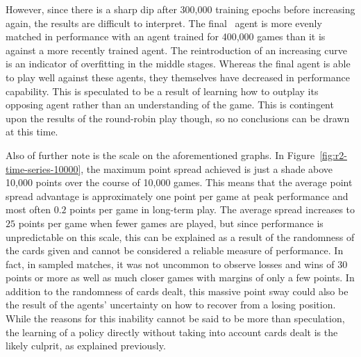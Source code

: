However,
since there is a sharp dip after 300,000 training epochs before increasing
again,
the results are difficult to interpret.
%
The final \learned\ agent is more evenly matched in performance with an agent
trained for 400,000 games
than it is against a more recently trained agent.
%
The reintroduction of an increasing curve
is an indicator of overfitting in the middle stages.
%
Whereas the final agent is able to play well against these agents,
they themselves have decreased in performance capability.
%
This is speculated to be a result of learning how to outplay its opposing agent
rather than an understanding of the game.
%
This is contingent upon the results of the round-robin play though,
so no conclusions can be drawn at this time.

Also of further note is the scale on the aforementioned graphs.
%
In Figure~\ref{fig:r2-time-series-10000},
the maximum point spread achieved is just a shade above 10,000 points
over the course of 10,000 games.
%
This means that the average point spread advantage is approximately 
one point per game at peak performance\textemdash
and most often $0.2$ points per game\textemdash
in long-term play.
%
The average spread increases to $25$ points per game when fewer games are 
played,
but since performance is unpredictable on this scale,
this can be explained as a result of the randomness of the cards given
and cannot be considered a reliable measure of performance.
%
In fact,
in sampled matches,
it was not uncommon to observe losses and wins of 30 points or more
as well as much closer games with margins of only a few points.
%
In addition to the randomness of cards dealt,
this massive point sway could also be the result of the agents' uncertainty on 
how to recover from a losing position.
%
While the reasons for this inability cannot be said to be more than speculation,
the learning of a policy directly without taking into account cards dealt
is the likely culprit,
as explained previously.

